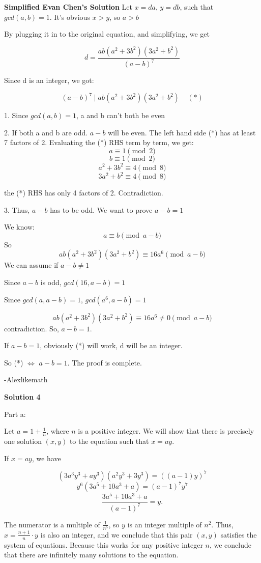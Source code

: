 \begin{enumerate}
 \textbf{Simplified Evan Chen's Solution} Let $x = da$, $y = db$, such that $gcd(a,b) = 1$. It's obvious $x > y$, so $a > b$ 

 By plugging it in to the original equation, and simplifying, we get

 
 \[d = \frac{ab(a^2 + 3b^2)(3a^2 + b^2)}{(a-b)^7}\]

 Since d is an integer, we got:

 
 \[(a-b)^7 \mid ab(a^2 + 3b^2)(3a^2 + b^2) \: \: \: \: \: (*)\]

 1. Since $gcd(a,b) = 1$, a and b can't both be even

 2. If both a and b are odd. $a-b$ will be even. The left hand side (*) has at least 7 factors of 2. Evaluating the (*) RHS term by term, we get:
 \[a \equiv 1 \pmod{2}\]
 \[b \equiv 1 \pmod{2}\]
 \[a^2 + 3b^2 \equiv 4 \pmod{8}\]
 \[3a^2 + b^2 \equiv 4 \pmod{8}\]

 the (*) RHS has only 4 factors of 2. Contradiction.

 3. Thus, $a-b$ has to be odd. We want to prove  $a-b=1$

 We know: 
 \[a \equiv b \pmod{a-b}\]So 
 \[ab(a^2 + 3b^2)(3a^2 + b^2) \equiv  16a^6 \pmod{a-b}\]We can assume if $a-b \neq 1$

 Since $a-b$ is odd,  $gcd(16, a-b) = 1$

 Since $gcd(a, a-b) = 1$, $gcd(a^6, a-b) = 1$

 \[ab(a^2 + 3b^2)(3a^2 + b^2) \equiv  16a^6 \neq 0 \pmod{a-b}\]contradiction.  So, $a-b = 1$. 

 If $a-b=1$, obviously (*) will work, d will be an integer. 

 So (*) $\Leftrightarrow$ $a-b=1$. The proof is complete.

 -Alexlikemath

 



\textbf{Solution 4}

Part a:

 Let $a = 1 + \frac{1}{n}$, where $n$ is a positive integer. We will show that there is precisely one solution $(x, y)$ to the equation such that $x = ay$. 

 If $x = ay$, we have 

 
 \[(3a^3y^3 + ay^3)(a^2y^3 + 3y^3) = ((a-1)y)^7\]
 \[y^6(3a^5 + 10a^3 + a) = (a-1)^7y^7\]
 \[\frac{3a^5 + 10a^3 + a}{(a-1)^7} = y.\]

 The numerator is a multiple of $\frac{1}{n^5}$, so $y$ is an integer multiple of $n^2$. Thus, $x = \frac{n+1}{n}\cdot y$ is also an integer, and we conclude that this pair $(x, y)$ satisfies the system of equations. Because this works for any positive integer $n$, we conclude that there are infinitely many solutions to the equation.


\end{enumerate}
